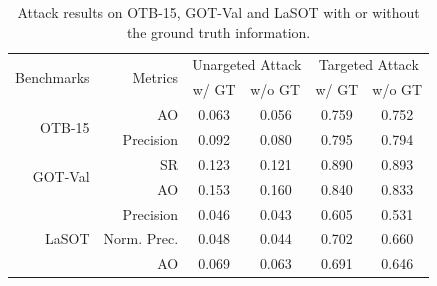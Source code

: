 \documentclass[journal]{IEEEtran}
\begin{document}
\begin{table}[t]
  \centering
  \caption{Attack results on OTB-15, GOT-Val and LaSOT with or without the ground truth information.}
  \begin{tabular}{rrcccc}
  \toprule
  \multirow{2}{*}[-2pt]{Benchmarks} & \multirow{2}{*}[-2pt]{Metrics} & \multicolumn{2}{c}{Unargeted Attack} & \multicolumn{2}{c}{Targeted Attack} \\ \cmidrule{3-6}
                              &                          & w/ GT  & \multicolumn{1}{l}{w/o GT}  & w/ GT  & \multicolumn{1}{l}{w/o GT} \\ \midrule
  \multirow{2}{*}{OTB-15}     & AO                       & 0.063  & 0.056                       & 0.759  & 0.752                      \\
                              & Precision                & 0.092  & 0.080                       & 0.795  & 0.794                      \\ \midrule
  \multirow{2}{*}{GOT-Val}    & SR                       & 0.123  & 0.121                       & 0.890  & 0.893                      \\
                              & AO                       & 0.153  & 0.160                       & 0.840  & 0.833                      \\ \midrule
  \multirow{3}{*}{LaSOT}      & Precision                & 0.046  & 0.043                       & 0.605  & 0.531                      \\
                              & Norm. Prec.              & 0.048  & 0.044                       & 0.702  & 0.660                      \\
                              & AO                       & 0.069  & 0.063                       & 0.691  & 0.646                      \\ \bottomrule
  \end{tabular}
  \label{tab:agent_GT}
\end{table}
\end{document}
